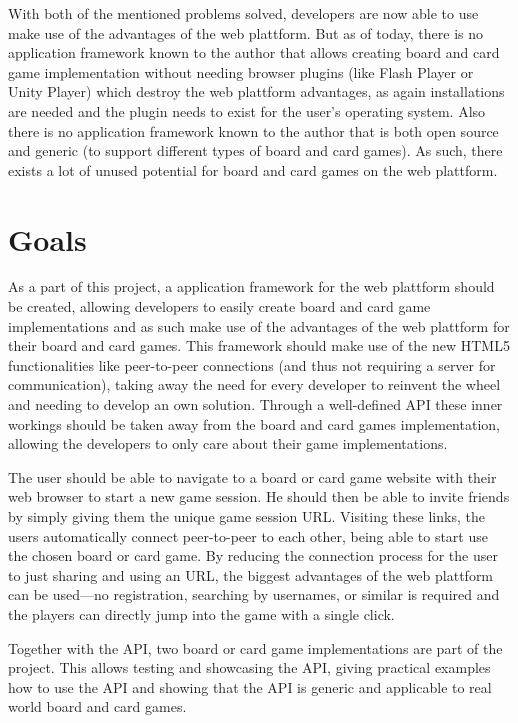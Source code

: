 With both of the mentioned problems solved, developers are now able to use make
use of the advantages of the web plattform. But as of today, there is no
application framework known to the author that allows creating board and card
game implementation without needing browser plugins (like Flash Player or Unity
Player) which destroy the web plattform advantages, as again installations are
needed and the plugin needs to exist for the user's operating system. Also there
is no application framework known to the author that is both open source and
generic (to support different types of board and card games). As such, there
exists a lot of unused potential for board and card games on the web plattform.

\section{Goals}

As a part of this project, a application framework for the web plattform should
be created, allowing developers to easily create board and card game
implementations and as such make use of the advantages of the web plattform for
their board and card games. This framework should make use of the new
\gls{HTML5} functionalities like \gls{peer-to-peer} connections (and thus not
requiring a server for communication), taking away the need for every developer
to reinvent the wheel and needing to develop an own solution. Through a
well-defined \gls{API} these inner workings should be taken away from the board
and card games implementation, allowing the developers to only care about their
game implementations.

The user should be able to navigate to a board or card game website with their
web browser to start a new game session. He should then be able to invite
friends by simply giving them the unique game session URL. Visiting these links,
the users automatically connect \gls{peer-to-peer} to each other, being able to
start use the chosen board or card game. By reducing the connection process for
the user to just sharing and using an URL, the biggest advantages of the web
plattform can be used---no registration, searching by usernames, or similar is
required and the players can directly jump into the game with a single click.

Together with the \gls{API}, two board or card game implementations are part of
the project. This allows testing and showcasing the \gls{API}, giving practical
examples how to use the \gls{API} and showing that the \gls{API} is generic and
applicable to real world board and card games.

